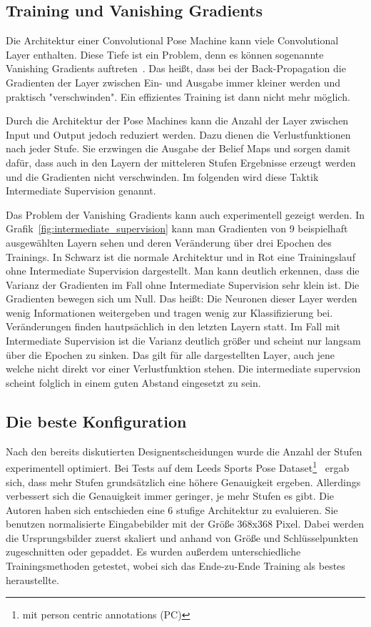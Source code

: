 \documentclass[journal, a4paper]{IEEEtran}
\begin{document}
\subsection{Training und Vanishing Gradients} \label{subsec:vanishing_gradients}

        Die Architektur einer Convolutional Pose Machine kann viele Convolutional Layer enthalten. Diese Tiefe ist ein Problem, denn es können sogenannte Vanishing Gradients auftreten~\cite{pascanu2013difficulty}. Das heißt, dass bei der Back-Propagation die Gradienten der Layer zwischen Ein- und Ausgabe immer kleiner werden und praktisch "verschwinden". Ein effizientes Training ist dann nicht mehr möglich.

        Durch die Architektur der Pose Machines kann die Anzahl der Layer zwischen Input und Output jedoch reduziert werden. Dazu dienen die Verlustfunktionen nach jeder Stufe. Sie erzwingen die Ausgabe der Belief Maps und sorgen damit dafür, dass auch in den Layern der mitteleren Stufen Ergebnisse erzeugt werden und die Gradienten nicht verschwinden. Im folgenden wird diese Taktik Intermediate Supervision genannt.

        Das Problem der Vanishing Gradients kann auch experimentell gezeigt werden. In Grafik~\ref{fig:intermediate_supervision} kann man Gradienten von 9 beispielhaft ausgewählten Layern sehen und deren Veränderung über drei Epochen des Trainings. In Schwarz ist die normale Architektur und in Rot eine Trainingslauf ohne Intermediate Supervision dargestellt. Man kann deutlich erkennen, dass die Varianz der Gradienten im Fall ohne Intermediate Supervision sehr klein ist. Die Gradienten bewegen sich um Null. Das heißt: Die Neuronen dieser Layer werden wenig Informationen weitergeben und tragen wenig zur Klassifizierung bei. Veränderungen finden hautpsächlich in den letzten Layern statt. Im Fall mit Intermediate Supervision ist die Varianz deutlich größer und scheint nur langsam über die Epochen zu sinken. Das gilt für alle dargestellten Layer, auch jene welche nicht direkt vor einer Verlustfunktion stehen. Die intermediate supervsion scheint folglich in einem guten Abstand eingesetzt zu sein.

\subsection{Die beste Konfiguration}
        
        Nach den bereits diskutierten Designentscheidungen wurde die Anzahl der Stufen experimentell optimiert. Bei Tests auf dem Leeds Sports Pose Dataset\footnote{mit person centric annotations (PC)}~\cite{LSP} ergab sich, dass mehr Stufen grundsätzlich eine höhere Genauigkeit ergeben. Allerdings verbessert sich die Genauigkeit immer geringer, je mehr Stufen es gibt. Die Autoren haben sich entschieden eine 6 stufige Architektur zu evaluieren. Sie benutzen normalisierte Eingabebilder mit der Größe 368x368 Pixel. Dabei werden die Ursprungsbilder zuerst skaliert und anhand von Größe und Schlüsselpunkten zugeschnitten oder gepaddet. Es wurden außerdem unterschiedliche Trainingsmethoden getestet, wobei sich das Ende-zu-Ende Training als bestes heraustellte.
\end{document}
